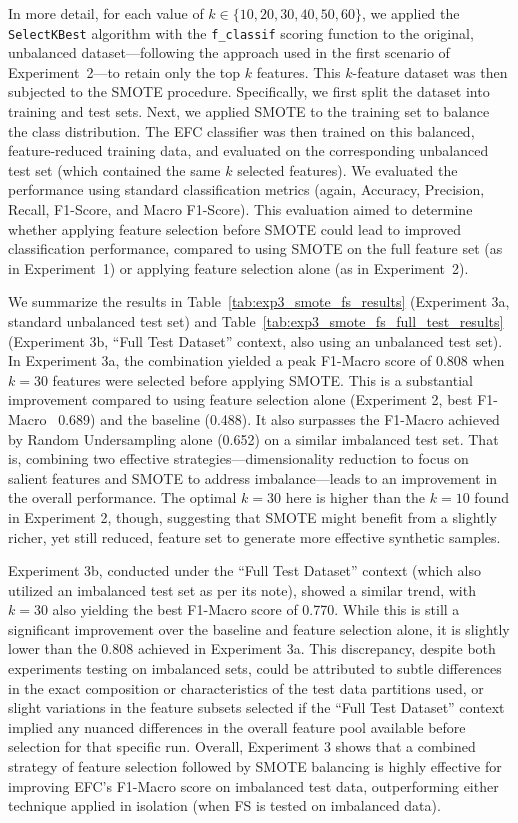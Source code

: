 \documentclass[12pt]{article}
\begin{document}
In more detail, for each value of $k \in \{10, 20, 30, 40, 50, 60\}$, we applied the \texttt{SelectKBest} algorithm with
the \texttt{f\_classif} scoring function to the original, unbalanced dataset---following the approach used in the first
scenario of Experiment~2---to retain only the top $k$ features. This $k$-feature dataset was then subjected to the SMOTE
procedure. Specifically, we first split the dataset into training and test sets. Next, we applied SMOTE to the training
set to balance the class distribution. The EFC classifier was then trained on this balanced, feature-reduced training data,
and evaluated on the corresponding unbalanced test set (which contained the same $k$ selected features).
We evaluated the performance using standard classification metrics (again, Accuracy, Precision, Recall, F1-Score, and Macro
F1-Score). This evaluation aimed to determine whether applying feature selection before SMOTE could lead to improved classification
performance, compared to using SMOTE on the full feature set (as in Experiment~1) or applying feature selection alone (as in Experiment~2).

We summarize the results in Table~\ref{tab:exp3_smote_fs_results} (Experiment 3a, standard unbalanced test set) and
Table~\ref{tab:exp3_smote_fs_full_test_results} (Experiment 3b, ``Full Test Dataset'' context, also using an unbalanced test set). 
In Experiment 3a, the combination yielded a peak F1-Macro score of 0.808 when $k=30$ features were selected before applying
SMOTE. This is a substantial improvement compared to using feature selection alone (Experiment 2, best F1-Macro ~0.689)
and the baseline (0.488). It also surpasses the F1-Macro achieved by Random Undersampling alone (0.652) on a similar imbalanced
test set. That is, combining two effective strategies---dimensionality reduction to focus on salient features and SMOTE to
address imbalance---leads to an improvement in the overall performance. The optimal $k=30$ here is higher than the $k=10$
found in Experiment 2, though, suggesting that SMOTE might benefit from a slightly richer, yet still reduced, feature
set to generate more effective synthetic samples. 

Experiment 3b, conducted under the ``Full Test Dataset'' context (which also utilized an imbalanced test set as per its
note), showed a similar trend, with $k=30$ also yielding the best F1-Macro score of 0.770. While this is still a significant
improvement over the baseline and feature selection alone, it is slightly lower than the 0.808 achieved in Experiment 3a.
This discrepancy, despite both experiments testing on imbalanced sets, could be attributed to subtle differences in the exact
composition or characteristics of the test data partitions used, or slight variations in the feature subsets selected if
the ``Full Test Dataset'' context implied any nuanced differences in the overall feature pool available before selection
for that specific run. Overall, Experiment 3 shows that a combined strategy of feature selection followed by SMOTE balancing
is highly effective for improving EFC's F1-Macro score on imbalanced test data, outperforming either technique applied in
isolation (when FS is tested on imbalanced data). 
\end{document}

